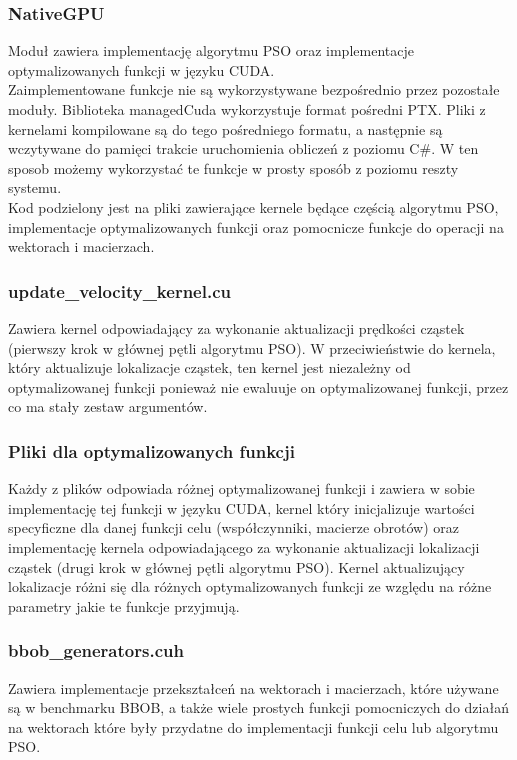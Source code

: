 \documentclass[12pt, twoside, openany, abstract=on]{report}
\theoremstyle{definition}
\begin{document}
\subsubsection{NativeGPU}
Moduł zawiera implementację algorytmu PSO oraz implementacje optymalizowanych funkcji w języku CUDA. \\

Zaimplementowane funkcje nie są wykorzystywane bezpośrednio przez pozostałe moduły. Biblioteka managedCuda wykorzystuje format pośredni PTX. Pliki z kernelami kompilowane są do tego pośredniego formatu, a następnie są wczytywane do pamięci trakcie uruchomienia obliczeń z poziomu C\#. W ten sposob możemy wykorzystać te funkcje w prosty sposób z poziomu reszty systemu. \\

Kod podzielony jest na pliki zawierające kernele będące częścią algorytmu PSO, implementacje optymalizowanych funkcji oraz pomocnicze funkcje do operacji na wektorach i macierzach.

\subsubsection{update\_velocity\_kernel.cu} 
Zawiera kernel odpowiadający za wykonanie aktualizacji prędkości cząstek (pierwszy krok w głównej pętli algorytmu PSO). W przeciwieństwie do kernela, który aktualizuje lokalizacje cząstek, ten kernel jest niezależny od optymalizowanej funkcji ponieważ nie ewaluuje on optymalizowanej funkcji, przez co ma stały zestaw argumentów.

\subsubsection{Pliki dla optymalizowanych funkcji} 
Każdy z plików odpowiada różnej optymalizowanej funkcji i zawiera w sobie implementację tej funkcji w języku CUDA, kernel który inicjalizuje wartości specyficzne dla danej funkcji celu (współczynniki, macierze obrotów) oraz implementację kernela odpowiadającego za wykonanie aktualizacji lokalizacji cząstek (drugi krok w głównej pętli algorytmu PSO). Kernel aktualizujący lokalizacje różni się dla różnych optymalizowanych funkcji ze względu na różne parametry jakie te funkcje przyjmują.

\subsubsection{bbob\_generators.cuh} 
Zawiera implementacje przekształceń na wektorach i macierzach, które używane są w benchmarku BBOB, a także wiele prostych funkcji pomocniczych do działań na wektorach które były przydatne do implementacji funkcji celu lub algorytmu PSO.
\end{document}

